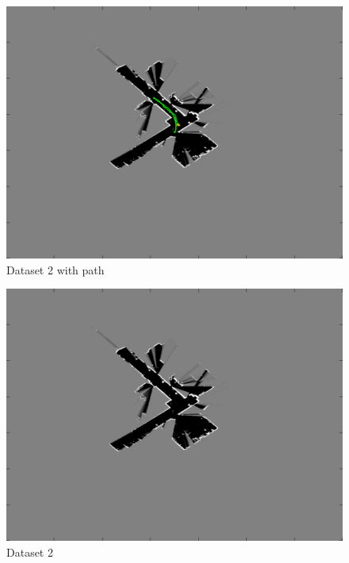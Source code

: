 \documentclass[english]{article}
\begin{document}
\begin{figure}[h]
\centering
\includegraphics[scale=0.65]{slam2_result}
\caption{Dataset 2 with path}
\end{figure}

\begin{figure}[h]
\centering
\includegraphics[scale=0.65]{slam2_result1}
\caption{Dataset 2}
\end{figure}
\end{document}
